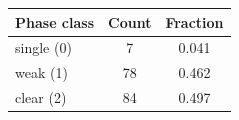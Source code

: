 \begin{tabular}{lcc}
\toprule
Phase class & Count & Fraction \\
\midrule
single (0) & 7 & 0.041 \\
weak (1) & 78 & 0.462 \\
clear (2) & 84 & 0.497 \\
\bottomrule
\end{tabular}